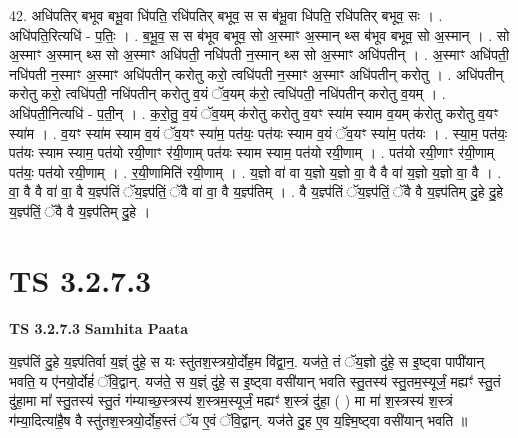 \documentclass[17pt]{extarticle}
\begin{document}
42. अधि॑पतिर् बभूव बभू॒वा धि॑पति॒ रधि॑पतिर् बभूव॒ स स ब॑भू॒वा धि॑पति॒ रधि॑पतिर् बभूव॒ सः । . अधि॑पति॒रित्यधि॑ - प॒तिः॒ । . ब॒भू॒व॒ स स ब॑भूव बभूव॒ सो अ॒स्माꣳ अ॒स्मान् थ्स ब॑भूव बभूव॒ सो अ॒स्मान् । . सो अ॒स्माꣳ अ॒स्मान् थ्स सो अ॒स्माꣳ अधि॑पती॒ नधि॑पती न॒स्मान् थ्स सो अ॒स्माꣳ अधि॑पतीन् । . अ॒स्माꣳ अधि॑पती॒ नधि॑पती न॒स्माꣳ अ॒स्माꣳ अधि॑पतीन् करोतु करो॒ त्वधि॑पती न॒स्माꣳ अ॒स्माꣳ अधि॑पतीन् करोतु । . अधि॑पतीन् करोतु करो॒ त्वधि॑पती॒ नधि॑पतीन् करोतु व॒यं ॅव॒यम् क॑रो॒ त्वधि॑पती॒ नधि॑पतीन् करोतु व॒यम् । . अधि॑पती॒नित्यधि॑ - प॒ती॒न् । . क॒रो॒तु॒ व॒यं ॅव॒यम् क॑रोतु करोतु व॒यꣳ स्या॑म स्याम व॒यम् क॑रोतु करोतु व॒यꣳ स्या॑म । . व॒यꣳ स्या॑म स्याम व॒यं ॅव॒यꣳ स्या॑म॒ पत॑यः॒ पत॑यः स्याम व॒यं ॅव॒यꣳ स्या॑म॒ पत॑यः । . स्या॒म॒ पत॑यः॒ पत॑यः स्याम स्याम॒ पत॑यो रयी॒णाꣳ र॑यी॒णाम् पत॑यः स्याम स्याम॒ पत॑यो रयी॒णाम् । . पत॑यो रयी॒णाꣳ र॑यी॒णाम् पत॑यः॒ पत॑यो रयी॒णाम् । . र॒यी॒णामिति॑ रयी॒णाम् । . य॒ज्ञो वा॑ वा य॒ज्ञो य॒ज्ञो वा॒ वै वै वा॑ य॒ज्ञो य॒ज्ञो वा॒ वै । . वा॒ वै वै वा॑ वा॒ वै य॒ज्ञ्प॑तिं ॅय॒ज्ञ्प॑तिं॒ ॅवै वा॑ वा॒ वै य॒ज्ञ्प॑तिम् । . वै य॒ज्ञ्प॑तिं ॅय॒ज्ञ्प॑तिं॒ ॅवै वै य॒ज्ञ्प॑तिम् दु॒हे दु॒हे य॒ज्ञ्प॑तिं॒ ॅवै वै य॒ज्ञ्प॑तिम् दु॒हे । \newline
\pagebreak
{}

\section{ TS 3.2.7.3 }

\textbf{TS 3.2.7.3 } \newline
\textbf{Samhita Paata} \newline

य॒ज्ञ्प॑तिं दु॒हे य॒ज्ञ्प॑तिर्वा य॒ज्ञ्ं दु॑हे॒ स यः स्तु॑तश॒स्त्रयो॒र्दोह॒म वि॑द्वा॒न॒. यज॑ते॒ तं ॅय॒ज्ञो दु॑हे॒ स इ॒ष्ट्वा पापी॑यान् भवति॒ य ए॑नयो॒र्दोहं॑ ॅवि॒द्वान्. यज॑ते॒ स य॒ज्ञ्ं दु॑हे॒ स इ॒ष्ट्वा वसी॑यान् भवति स्तु॒तस्य॑ स्तु॒तम॒स्यूर्जं॒ मह्यꣳ॑ स्तु॒तं दु॑हा॒मा मा᳚ स्तु॒तस्य॑ स्तु॒तं ग॑म्याच्छ॒स्त्रस्य॑ श॒स्त्रम॒स्यूर्जं॒ मह्यꣳ॑ श॒स्त्रं दु॑हा॒ ( ) मा मा॑ श॒स्त्रस्य॑ श॒स्त्रं ग॑म्या॒दित्या॑है॒ष वै स्तु॑तश॒स्त्रयो॒र्दोह॒स्तं ॅय ए॒वं ॅवि॒द्वान्. यज॑ते दु॒ह ए॒व य॒ज्ञ्मि॒ष्ट्वा वसी॑यान् भवति ॥ \newline
\end{document}
